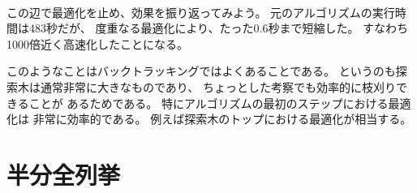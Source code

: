\begin{comment}
~\\
Now is a good moment to stop optimizing
the algorithm and see what we have achieved.
The running time of the original algorithm
was 483 seconds,
and now after the optimizations,
the running time is only 0.6 seconds.
Thus, the algorithm became nearly 1000 times
faster after the optimizations.

This is a usual phenomenon in backtracking,
because the search tree is usually large
and even simple observations can effectively
prune the search.
Especially useful are optimizations that
occur during the first steps of the algorithm,
i.e., at the top of the search tree.
\end{comment}

~\\
この辺で最適化を止め、効果を振り返ってみよう。
元のアルゴリズムの実行時間は483秒だが、
度重なる最適化により、たった0.6秒まで短縮した。
すなわち1000倍近く高速化したことになる。

このようなことはバックトラッキングではよくあることである。
というのも探索木は通常非常に大きなものであり、
ちょっとした考察でも効率的に枝刈りできることが
あるためである。
特にアルゴリズムの最初のステップにおける最適化は
非常に効率的である。
例えば探索木のトップにおける最適化が相当する。

\begin{comment}
\section{Meet in the middle}

\index{meet in the middle}

\key{Meet in the middle} is a technique
where the search space is divided into
two parts of about equal size.
A separate search is performed
for both of the parts,
and finally the results of the searches are combined.

The technique can be used
if there is an efficient way to combine the
results of the searches.
In such a situation, the two searches may require less
time than one large search.
Typically, we can turn a factor of $2^n$
into a factor of $2^{n/2}$ using the meet in the
middle technique.
\end{comment}

\section{半分全列挙}

